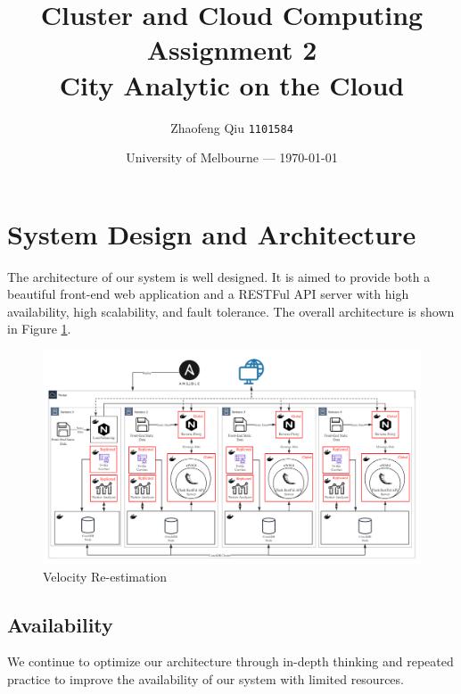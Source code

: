 \documentclass{article}
\title{Cluster and Cloud Computing Assignment 2
		\\ City Analytic on the Cloud} %
\author{ Zhaofeng Qiu \texttt{1101584}} %
\date{University of Melbourne --- \today} %
\begin{document}
\maketitle %


\section{System Design and Architecture}
The architecture of our system is well designed. It is aimed to provide both a beautiful front-end web application and a RESTFul API server with high availability, high scalability, and fault tolerance. The overall architecture is shown in Figure \ref{fig:systemArchitecturePsystemArchitecture}. 

\begin{figure}[htp]
\centering
\includegraphics[width=\textwidth]{img/architecture.png}
\caption{Velocity Re-estimation}
\label{fig:systemArchitecturePsystemArchitecture}
\end{figure}

\subsection{Availability}
We continue to optimize our architecture through in-depth thinking and repeated practice to improve the availability of our system with limited resources.
\end{document}
